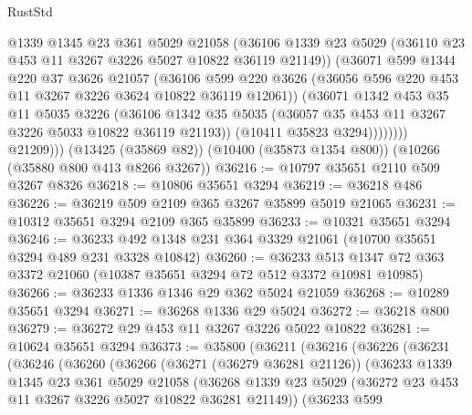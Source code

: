 \begin{lexlean}{RustStd}
\begin{coremodule}
{\begin{coremodule}
{{{{{{{{{{{{{{{{{{{{{{{{{                    @1339
                    @1345
                    @23
                    @361
                    @5029
                    @21058
                    (@36106
                      @1339
                      @23
                      @5029
                      (@36110 @23 @453 @11 @3267 @3226 @5027 @10822 @36119 @21149))
                    (@36071
                      @599
                      @1344
                      @220
                      @37
                      @3626
                      @21057
                      (@36106
                        @599
                        @220
                        @3626
                        (@36056 @596 @220 @453 @11 @3267 @3226 @3624 @10822 @36119 @12061))
                      (@36071
                        @1342
                        @453
                        @35
                        @11
                        @5035
                        @3226
                        (@36106
                          @1342
                          @35
                          @5035
                          (@36057 @35 @453 @11 @3267 @3226 @5033 @10822 @36119 @21193))
                        (@10411 @35823 @3294))))))))
          @21209)))
    (@13425 (@35869 @82))
    (@10400 (@35873 @1354 @800))
    (@10266 (@35880 @800 @413 @8266 @3267))
@36216 := @10797 @35651 @2110 @509 @3267 @8326
@36218 := @10806 @35651 @3294
@36219 := @36218 @486
@36226 := @36219 @509 @2109 @365 @3267 @35899 @5019 @21065
@36231 := @10312 @35651 @3294 @2109 @365 @35899
@36233 := @10321 @35651 @3294
@36246 := @36233 @492 @1348 @231 @364 @3329 @21061 (@10700 @35651 @3294 @489 @231 @3328 @10842)
@36260 := @36233 @513 @1347 @72 @363 @3372 @21060 (@10387 @35651 @3294 @72 @512 @3372 @10981 @10985)
@36266 := @36233 @1336 @1346 @29 @362 @5024 @21059
@36268 := @10289 @35651 @3294
@36271 := @36268 @1336 @29 @5024
@36272 := @36218 @800
@36279 := @36272 @29 @453 @11 @3267 @3226 @5022 @10822
@36281 := @10624 @35651 @3294
@36373 := @35800
    (@36211
      (@36216
        (@36226
          (@36231
            (@36246
              (@36260
                (@36266
                  (@36271 (@36279 @36281 @21126))
                  (@36233
                    @1339
                    @1345
                    @23
                    @361
                    @5029
                    @21058
                    (@36268
                      @1339
                      @23
                      @5029
                      (@36272 @23 @453 @11 @3267 @3226 @5027 @10822 @36281 @21149))
                    (@36233
                      @599
}}}}}}}}}}}}}}}}}}}}}}}}}
\end{coremodule}}
\end{coremodule}
\end{lexlean}
